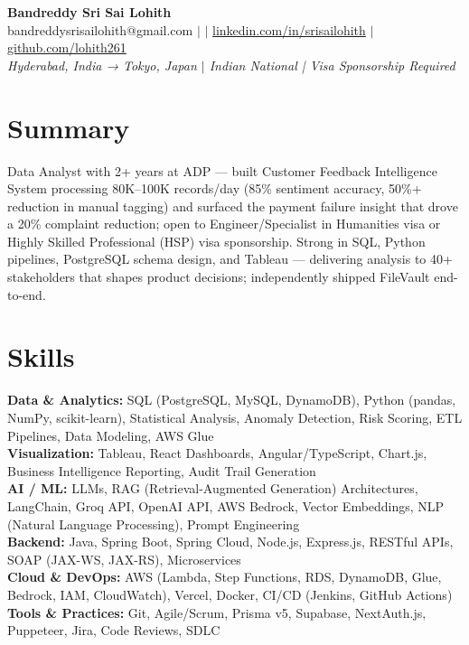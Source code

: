 \documentclass[10pt,letterpaper]{article}
\newcommand{\skillrow}[2]{\textbf{#1:} #2 \\[1pt]}
\begin{document}
\begin{center}
  {\Huge\bfseries Bandreddy Sri Sai Lohith}\\[3pt]
  \small bandreddysrisailohith@gmail.com $\vert$ $\vert$\; \href{https://linkedin.com/in/srisailohith}{linkedin.com/in/srisailohith} $\vert$\; \href{https://github.com/lohith261}{github.com/lohith261} \\[2pt]
  \small\textit{Hyderabad, India → Tokyo, Japan $\vert$\; Indian National | Visa Sponsorship Required}
\end{center}

\section{Summary}

Data Analyst with 2+ years at ADP --- built Customer Feedback Intelligence System processing 80K--100K records/day (85\% sentiment accuracy, 50\%+ reduction in manual tagging) and surfaced the payment failure insight that drove a 20\% complaint reduction; open to Engineer/Specialist in Humanities visa or Highly Skilled Professional (HSP) visa sponsorship.
      Strong in SQL, Python pipelines, PostgreSQL schema design, and Tableau --- delivering analysis to 40+ stakeholders that shapes product decisions; independently shipped FileVault end-to-end.

\section{Skills}

\skillrow{Data \& Analytics}{SQL (PostgreSQL, MySQL, DynamoDB), Python (pandas, NumPy, scikit-learn), Statistical Analysis, Anomaly Detection, Risk Scoring, ETL Pipelines, Data Modeling, AWS Glue}
\skillrow{Visualization}{Tableau, React Dashboards, Angular/TypeScript, Chart.js, Business Intelligence Reporting, Audit Trail Generation}
\skillrow{AI / ML}{LLMs, RAG (Retrieval-Augmented Generation) Architectures, LangChain, Groq API, OpenAI API, AWS Bedrock, Vector Embeddings, NLP (Natural Language Processing), Prompt Engineering}
\skillrow{Backend}{Java, Spring Boot, Spring Cloud, Node.js, Express.js, RESTful APIs, SOAP (JAX-WS, JAX-RS), Microservices}
\skillrow{Cloud \& DevOps}{AWS (Lambda, Step Functions, RDS, DynamoDB, Glue, Bedrock, IAM, CloudWatch), Vercel, Docker, CI/CD (Jenkins, GitHub Actions)}
\skillrow{Tools \& Practices}{Git, Agile/Scrum, Prisma v5, Supabase, NextAuth.js, Puppeteer, Jira, Code Reviews, SDLC}
\end{document}
